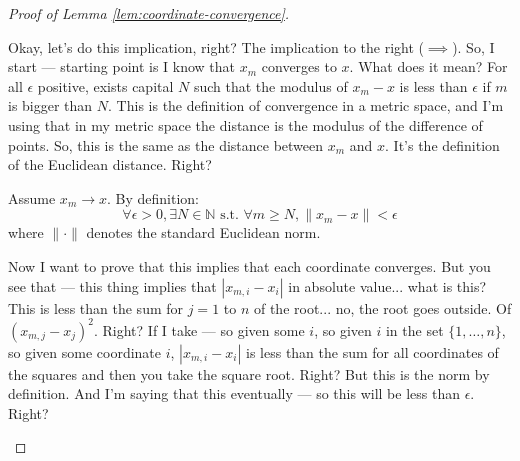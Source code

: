 \begin{proof}[Proof of Lemma \ref{lem:coordinate-convergence}]
\begin{spoken-clean}[00:17:21 - 00:18:42]
Okay, let's do this implication, right? The implication to the right ($\implies$). So, I start --- starting point is I know that $x_m$ converges to $x$. What does it mean?  For all $\epsilon$ positive, exists capital $N$ such that the modulus of $x_m - x$ is less than $\epsilon$ if $m$ is bigger than $N$. This is the definition of convergence in a metric space, and I'm using that in my metric space the distance is the modulus of the difference of points. So, this is the same as the distance between $x_m$ and $x$. It's the definition of the Euclidean distance. Right?
\end{spoken-clean}

\begin{math-stroke}[Proof: Implication \texorpdfstring{$\implies$}{=>}]
Assume $x_m \to x$. By definition:
\[ \forall \epsilon > 0, \exists N \in \mathbb{N} \text{ s.t. } \forall m \ge N, \|x_m - x\| < \epsilon \]
where $\| \cdot \|$ denotes the standard Euclidean norm.
\end{math-stroke}


\begin{spoken-clean}[00:18:42 - 00:20:12]
Now I want to prove that this implies that each coordinate converges. But you see that ---  this thing implies that $|x_{m,i} - x_i|$ in absolute value... what is this? This is less than the sum for $j=1$ to $n$ of the root... no, the root goes outside. Of $(x_{m,j} - x_j)^2$. Right? If I take --- so given some $i$, so given $i$ in the set $\{1, \dots, n\}$, so given some coordinate $i$, $|x_{m,i} - x_i|$ is less than the sum for all coordinates of the squares and then you take the square root. Right? But this is the norm by definition. And I'm saying that this eventually --- so this will be less than $\epsilon$. Right?
\end{spoken-clean}


\end{proof}
